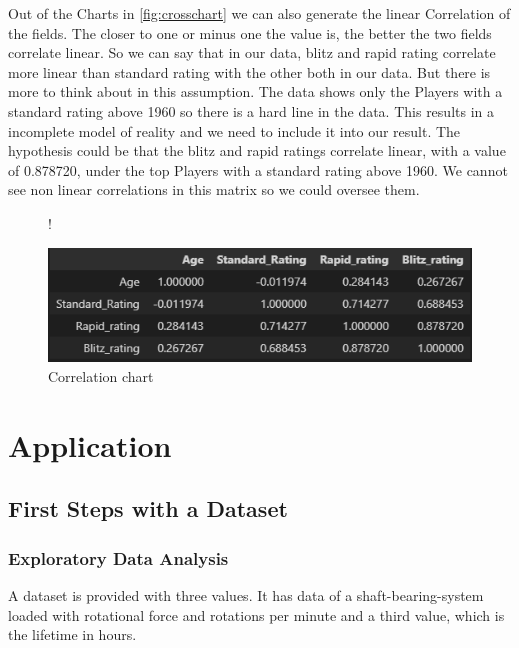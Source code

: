 \documentclass[a4paper, 12pt, oneside]{scrbook}
\begin{document}
			\noindent Out of the Charts in \ref{fig:crosschart} we can also generate the linear Correlation of the fields. The closer to one or minus one the value is, the better the two fields correlate linear. So we can say that in our data, blitz and rapid rating correlate more linear than standard rating with the other both in our data. But there is more to think about in this assumption. The data shows only the Players with a standard rating above 1960 so there is a hard line in the data. This results in a incomplete model of reality and we need to include it into our result. 
			The hypothesis could be that the blitz and rapid ratings correlate linear, with a value of 0.878720, under the top Players with a standard rating above 1960.
			We cannot see non linear correlations in this matrix so we could oversee them.
			
			\begin{figure} [H]
				\centering
				\resizebox{\linewidth} {!} {
					\includegraphics{res/Correlation.png}
					
				}
				\caption{Correlation chart}
				\label{fig:correlation}
			\end{figure}
			
	\chapter{Application}
		\section{First Steps with a Dataset}
			\subsection{Exploratory Data Analysis}
			\noindent A dataset is provided with three values. It has data of a shaft-bearing-system loaded with rotational force and rotations per minute and a third value, which is the lifetime in hours.
			
\end{document}
